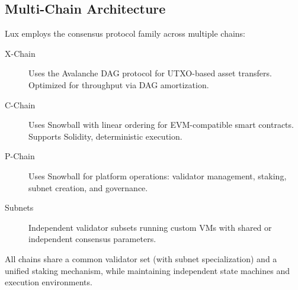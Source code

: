 \subsection{Multi-Chain Architecture}

Lux employs the consensus protocol family across multiple chains:

\begin{description}
    \item[X-Chain] Uses the Avalanche DAG protocol for UTXO-based asset transfers. Optimized for throughput via DAG amortization.
    \item[C-Chain] Uses Snowball with linear ordering for EVM-compatible smart contracts. Supports Solidity, deterministic execution.
    \item[P-Chain] Uses Snowball for platform operations: validator management, staking, subnet creation, and governance.
    \item[Subnets] Independent validator subsets running custom VMs with shared or independent consensus parameters.
\end{description}

All chains share a common validator set (with subnet specialization) and a unified staking mechanism, while maintaining independent state machines and execution environments.
